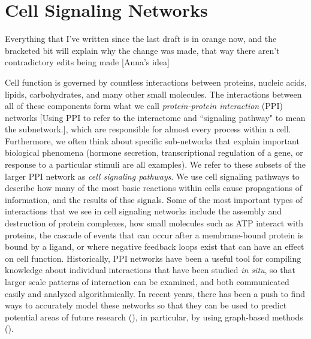 \documentclass[12pt,twoside]{reedthesis}
\newcommand{\new}[2]{{\color{orange}#1 [#2]}}
\theoremstyle{definition}
\begin{document}
\chapter{Cell Signaling Networks}

\new{Everything that I've written since the last draft is in orange now, and the bracketed bit will explain why the change was made, that way there aren't contradictory edits being made}{Anna's idea}

Cell function is governed by countless interactions between proteins, nucleic acids, lipids, carbohydrates, and many other small molecules.  The interactions between all of these components form what we call \new{\textit{protein-protein interaction} (PPI) networks}{Using PPI to refer to the interactome and ``signaling pathway" to mean the subnetwork.}, which are responsible for almost every process within a cell. Furthermore, we often think about specific sub-networks that explain important biological phenomena (hormone secretion, transcriptional regulation of a gene, or response to a particular stimuli are all examples). We refer to these subsets of the larger PPI network as \textit{cell signaling pathways}. We use cell signaling pathways to describe how many of the most basic reactions within cells cause propagations of information, and the results of thse signals.  Some of the most important types of interactions that we see in cell signaling networks include the assembly and destruction of protein complexes, how small molecules such as ATP interact with proteins, the cascade of events that can occur after a membrane-bound protein is bound by a ligand, or where negative feedback loops exist that can have an effect on cell function.  Historically, PPI networks have been a useful tool for compiling knowledge about individual interactions that have been studied \textit{in situ}, so that larger scale patterns of interaction can be examined, and both communicated easily and analyzed algorithmically. In recent years, there has been a push to find ways to accurately model these networks so that they can be used to predict potential areas of future research (\cite{papers}), in particular, by using graph-based methods (\cite{Aittokallio2006}).\par
\end{document}
